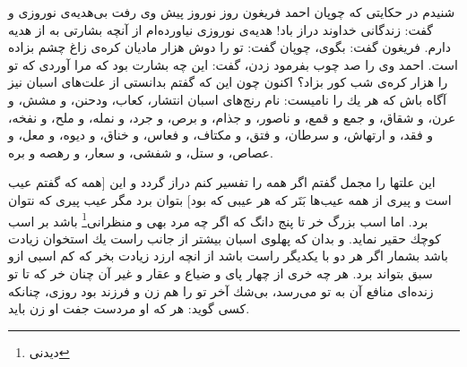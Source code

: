 شنيدم در حكايتى كه چوپان احمد فريغون روز نوروز پيش وى رفت بى‌هديه‌ی نوروزى و گفت: زندگانى خداوند دراز باد! هديه‌ی نوروزى نياورده‌ام از آنچه بشارتى به از هديه دارم. فريغون گفت: بگوى، چوپان گفت: تو را دوش هزار ماديان كره‌ی زاغ چشم بزاده است. احمد وى را صد چوب بفرمود زدن، گفت: اين چه بشارت بود كه مرا آوردى كه تو را هزار كره‌ی شب كور بزاد؟ اكنون چون اين كه گفتم بدانستى از علت‌هاى اسبان نيز آگاه باش كه هر يك را ناميست: نام رنج‌هاى اسبان انتشار، كعاب، ودحنن، و مشش، و عرن، و شقاق، و جمع و قمع، و ناصور، و جذام، و برص، و جرد، و نمله، و ملح، و نفخه، و فقد، و ارتهاش، و سرطان، و فتق، و مكتاف، و فعاس، و خناق، و ديوه، و معل، و عصاص، و ستل، و شفشى، و سعار، و رهصه و بره.

اين علتها را مجمل گفتم اگر همه را تفسير كنم دراز گردد و اين [همه كه گفتم عيب است و پيرى از همه عيب‌ها بَتَر كه هر عيبى كه بود] بتوان برد مگر عيب پيرى كه نتوان برد. اما اسب بزرگ خر تا پنج دانگ كه اگر چه مرد بهى و منظرانى\footnote{دیدنی} باشد بر اسب كوچك حقير نمايد. و بدان كه پهلوى اسبان بيشتر از جانب راست يك استخوان زيادت باشد بشمار اگر هر دو با يكديگر راست باشد از انچه ارزد زيادت بخر كه كم اسبى ازو سبق بتواند برد. هر چه خرى از چهار پاى و ضياع و عقار و غير آن چنان خر كه تا تو زنده‌اى منافع آن به تو مى‌رسد، بى‌شك آخر تو را هم زن و فرزند بود روزى، چنانكه كسى گويد: هر كه او مردست جفت او زن بايد.



\newpage
